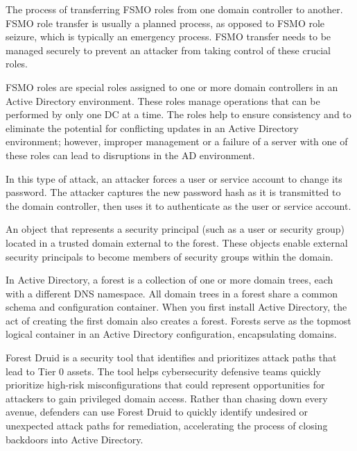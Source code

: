 { The process of transferring FSMO roles from one domain controller to another. FSMO role transfer is usually a planned process, as opposed to FSMO role seizure, which is typically an emergency process. FSMO transfer needs to be managed securely to prevent an attacker from taking control of these crucial roles.

 FSMO roles are special roles assigned to one or more domain controllers in an Active Directory environment. These roles manage operations that can be performed by only one DC at a time. The roles help to ensure consistency and to eliminate the potential for conflicting updates in an Active Directory environment; however, improper management or a failure of a server with one of these roles can lead to disruptions in the AD environment.

 In this type of attack, an attacker forces a user or service account to change its password. The attacker captures the new password hash as it is transmitted to the domain controller, then uses it to authenticate as the user or service account.

} An object that represents a security principal (such as a user or security group) located in a trusted domain external to the forest. These objects enable external security principals to become members of security groups within the domain.

 In Active Directory, a forest is a collection of one or more domain trees, each with a different DNS namespace. All domain trees in a forest share a common schema and configuration container. When you first install Active Directory, the act of creating the first domain also creates a forest. Forests serve as the topmost logical container in an Active Directory configuration, encapsulating domains.

 Forest Druid is a security tool that identifies and prioritizes attack paths that lead to Tier 0 assets. The tool helps cybersecurity defensive teams quickly prioritize high-risk misconfigurations that could represent opportunities for attackers to gain privileged domain access. Rather than chasing down every avenue, defenders can use Forest Druid to quickly identify undesired or unexpected attack paths for remediation, accelerating the process of closing backdoors into Active Directory.

